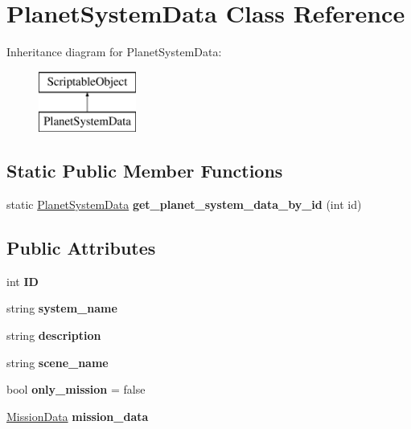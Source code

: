 \hypertarget{class_planet_system_data}{}\section{Planet\+System\+Data Class Reference}
\label{class_planet_system_data}
Inheritance diagram for Planet\+System\+Data\+:\begin{figure}[H]
\begin{center}
\leavevmode
\includegraphics[height=2.000000cm]{class_planet_system_data}
\end{center}
\end{figure}
\subsection*{Static Public Member Functions}
\begin{DoxyCompactItemize}
\item 
\mbox{\label{class_planet_system_data_ad92ecaaf1f3a93a73f31edf633d87295}} 
static \hyperlink{class_planet_system_data}{Planet\+System\+Data} {\bfseries get\+\_\+planet\+\_\+system\+\_\+data\+\_\+by\+\_\+id} (int id)
\end{DoxyCompactItemize}
\subsection*{Public Attributes}
\begin{DoxyCompactItemize}
\item 
\mbox{\label{class_planet_system_data_ac1e0e0e22bf682d83e169a948e37e8de}} 
int {\bfseries ID}
\item 
\mbox{\label{class_planet_system_data_aef5461cb330012608d4bc3a5b4ed339d}} 
string {\bfseries system\+\_\+name}
\item 
\mbox{\label{class_planet_system_data_ae2b9b4f5756e78728756ef8596742ac4}} 
string {\bfseries description}
\item 
\mbox{\label{class_planet_system_data_ae08111fb4983f8c692a4a9e0b6862467}} 
string {\bfseries scene\+\_\+name}
\item 
\mbox{\label{class_planet_system_data_a33dc9b9ccc32be44868a0a344925245d}} 
bool {\bfseries only\+\_\+mission} = false
\item 
\mbox{\label{class_planet_system_data_a813c72e79956187c3ca88a31748b6d74}} 
\hyperlink{class_mission_data}{Mission\+Data} {\bfseries mission\+\_\+data}
\end{DoxyCompactItemize}
